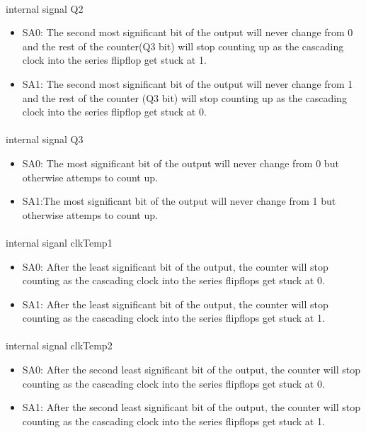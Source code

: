 \documentclass{article}
\begin{document}
	\paragraph{} internal signal Q2
	\begin{itemize}
		\item SA0: The second most significant bit of the output will never change from 0 and the rest of the counter(Q3 bit) will stop counting up as the cascading clock into the series flipflop get stuck at 1. 
		\item SA1: The second most significant bit of the output will never change from 1 and the rest of the counter (Q3 bit) will stop counting up as the cascading clock into the series flipflop get stuck at 0. 
	\end{itemize}

	\paragraph{} internal signal Q3
	\begin{itemize}
		\item SA0: The most significant bit of the output will never change from 0 but otherwise attemps to count up.
		\item SA1:The most significant bit of the output will never change from 1 but otherwise attemps to count up. 
	\end{itemize}

	\paragraph{} internal siganl clkTemp1
	\begin{itemize}
		\item SA0: After the least significant bit  of the output, the counter will stop counting as the cascading clock into the series flipflops get stuck at 0.
		\item SA1: After the least significant bit  of the output, the counter will stop counting as the cascading clock into the series flipflops get stuck at 1. 
	\end{itemize}

	\paragraph{} internal signal clkTemp2
	\begin{itemize}
		\item SA0:  After the second least significant bit  of the output, the counter will stop counting as the  cascading clock into the series flipflops get stuck at 0.
		\item SA1: After the second least significant bit  of the output, the counter will stop counting as the  cascading clock into the series flipflops get stuck at 1. 
	\end{itemize}
\end{document}
